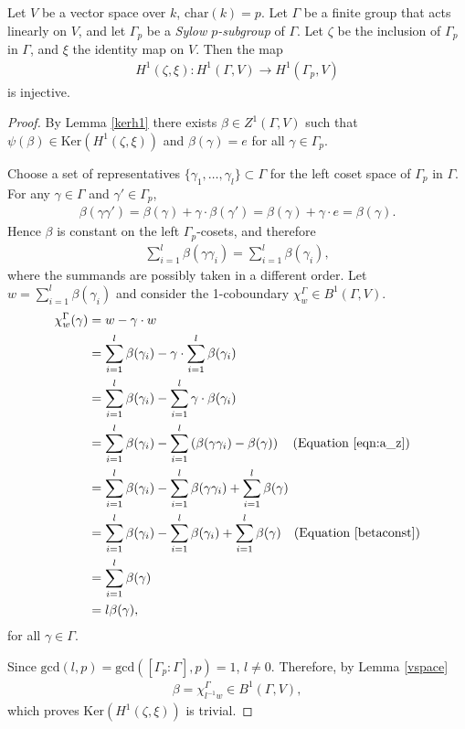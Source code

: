 \begin{lemma} \label{brown}
Let $V$ be a vector space over $k$, $\mathrm{char}(k) = p$. Let $\Gamma$ be a finite group that acts linearly on $V$, and let $\Gamma_p$ be a \emph{Sylow $p$-subgroup} of $\Gamma$. Let $\zeta$ be the inclusion of $\Gamma_p$ in $\Gamma$, and $\xi$ the identity map on $V$. Then the map 
\begin{align*}
H^1(\zeta, \xi):H^1(\Gamma, V)\rightarrow H^1(\Gamma_p, V)
\end{align*}
is injective.
\end{lemma}
\begin{proof}
	By Lemma \ref{kerh1} there exists $\beta \in Z^1(\Gamma, V)$ such that $\psi(\beta) \in \mathrm{Ker}\left(H^1(\zeta, \xi)\right)$ and $\beta(\gamma) = e$ for all $\gamma \in \Gamma_p$.
	
	Choose a set of representatives $\{\gamma_1, \ldots, \gamma_l\} \subset \Gamma$ for the left coset space of $\Gamma_p$ in $\Gamma$.
	For any $\gamma \in \Gamma$ and $\gamma' \in \Gamma_p$,
\begin{align*}
	\beta(\gamma \gamma') = \beta(\gamma) + \gamma \cdot \beta(\gamma') = \beta(\gamma) +\gamma \cdot e = \beta(\gamma).
\end{align*} 
Hence $\beta$ is constant on the left $\Gamma_p$-cosets, and therefore
\begin{align}\label{betaconst}
	\sum_{i = 1}^l \beta(\gamma\gamma_i) = \sum_{i = 1}^l \beta(\gamma_i),
\end{align}
where the summands are possibly taken in a different order. 
Let $w = \sum_{i=1}^l \beta(\gamma_i)$ and consider the 1-coboundary $\chi^\Gamma_w \in B^1(\Gamma, V)$.
\begin{align*}
	\chi_{w}^\Gamma(\gamma) &=  w - \gamma\cdot w \\
	&=  \sum_{i = 1}^l\beta(\gamma_i) - \gamma\cdot \sum_{i = 1}^l\beta(\gamma_i) \\
	&=  \sum_{i = 1}^l\beta(\gamma_i) - \sum_{i = 1}^l\gamma \cdot \beta(\gamma_i) \\
	&=  \sum_{i = 1}^l\beta(\gamma_i) - \sum_{i = 1}^l\left(\beta(\gamma\gamma_i) - \beta(\gamma)\right) \quad(\textrm{Equation }\ref{eqn:a_z})\\
	&=  \sum_{i = 1}^l\beta(\gamma_i) - \sum_{i = 1}^l \beta(\gamma\gamma_i) +\sum_{i = 1}^l \beta(\gamma) \\
	&=  \sum_{i = 1}^l\beta(\gamma_i) - \sum_{i = 1}^l \beta(\gamma_i) +\sum_{i = 1}^l \beta(\gamma) \quad(\textrm{Equation }\ref{betaconst})\\
	&=  \sum_{i = 1}^l \beta(\gamma) \\
	&= l\beta(\gamma),
\end{align*}
for all $\gamma \in \Gamma$.

Since $\mathrm{gcd}(l, p) = \mathrm{gcd}\left([\Gamma_p:\Gamma], p\right) = 1$, $l \neq 0$. Therefore, by Lemma \ref{vspace}
\begin{align*}
	\beta = \chi^\Gamma_{l^{-1}w} \in B^1(\Gamma, V),
\end{align*}
which proves $\mathrm{Ker}\left(H^1(\zeta, \xi)\right)$ is trivial.
\end{proof}

